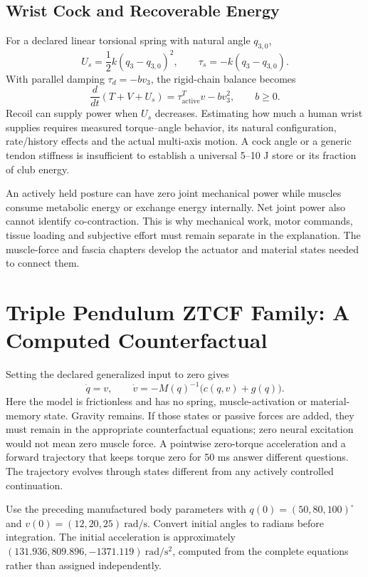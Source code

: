 \subsection{Wrist Cock and Recoverable Energy}
\label{inplain:wrist_cock_energy}
\label{laymans:inplain:wrist_cock_energy}
For a declared linear torsional spring with natural angle $q_{3,0}$,
\[
U_s=\frac12 k(q_3-q_{3,0})^2,\qquad
\tau_s=-k(q_3-q_{3,0}).
\]
With parallel damping $\tau_d=-b v_3$, the rigid-chain balance becomes
\[
\frac{d}{dt}(T+V+U_s)=\tau_{\mathrm{active}}^T v-bv_3^2,
\qquad b\ge0.
\]
Recoil can supply power when $U_s$ decreases. Estimating how much a human wrist supplies requires measured torque--angle behavior, its natural configuration, rate/history effects and the actual multi-axis motion. A cock angle or a generic tendon stiffness is insufficient to establish a universal 5--10 J store or its fraction of club energy.

An actively held posture can have zero joint mechanical power while muscles consume metabolic energy or exchange energy internally. Net joint power also cannot identify co-contraction. This is why mechanical work, motor commands, tissue loading and subjective effort must remain separate in the explanation. The muscle-force and fascia chapters develop the actuator and material states needed to connect them.

\section{Triple Pendulum ZTCF Family: A Computed Counterfactual}
\label{sec:triple_pendulum_ztcf}
\label{ex:triple_pendulum_ztcf_example}
Setting the declared generalized input to zero gives
\begin{equation}
\dot q=v,\qquad \dot v=-M(q)^{-1}\bigl(c(q,v)+g(q)\bigr).
\label{eq:triple_ztcf_ode}
\end{equation}
Here the model is frictionless and has no spring, muscle-activation or material-memory state. Gravity remains. If those states or passive forces are added, they must remain in the appropriate counterfactual equations; zero neural excitation would not mean zero muscle force. A pointwise zero-torque acceleration and a forward trajectory that keeps torque zero for 50 ms answer different questions. The trajectory evolves through states different from any actively controlled continuation.

Use the preceding manufactured body parameters with $q(0)=(50,80,100)^\circ$ and $v(0)=(12,20,25)\ \mathrm{rad/s}$. Convert initial angles to radians before integration. The initial acceleration is approximately $(131.936,809.896,-1371.119)\ \mathrm{rad/s^2}$, computed from the complete equations rather than assigned independently.


